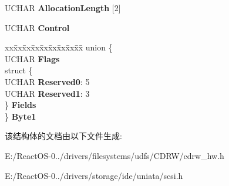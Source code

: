 \begin{DoxyCompactItemize}
\begin{tabbing}
\end{tabbing}\item 
\mbox{\label{struct___c_d_b_1_1___r_e_a_d___f_o_r_m_a_t___c_a_p_a_c_i_t_i_e_s_a83727944c83b06e35efeaeb38c40cab6}} 
U\+C\+H\+AR {\bfseries Allocation\+Length} \mbox{[}2\mbox{]}
\item 
\mbox{\label{struct___c_d_b_1_1___r_e_a_d___f_o_r_m_a_t___c_a_p_a_c_i_t_i_e_s_aa0b5dbb2fceb965fcfb04f96f8710aee}} 
U\+C\+H\+AR {\bfseries Control}
\item 
\mbox{\label{struct___c_d_b_1_1___r_e_a_d___f_o_r_m_a_t___c_a_p_a_c_i_t_i_e_s_a1030fb64770a896d67c071253aedd9f6}} 
\begin{tabbing}
xx\=xx\=xx\=xx\=xx\=xx\=xx\=xx\=xx\=\kill
union \{\\
\>UCHAR {\bfseries Flags}\\
\>struct \{\\
\>\>UCHAR {\bfseries Reserved0}: 5\\
\>\>UCHAR {\bfseries Reserved1}: 3\\
\>\} {\bfseries Fields}\\
\} {\bfseries Byte1}\\

\end{tabbing}\end{DoxyCompactItemize}


该结构体的文档由以下文件生成\+:\begin{DoxyCompactItemize}
\item 
E\+:/\+React\+O\+S-\/0../drivers/filesystems/udfs/\+C\+D\+R\+W/cdrw\+\_\+hw.\+h\item 
E\+:/\+React\+O\+S-\/0../drivers/storage/ide/uniata/scsi.\+h\end{DoxyCompactItemize}
